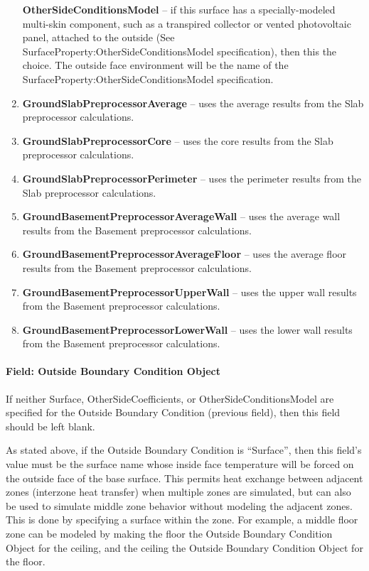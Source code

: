 \begin{enumerate}
    \textbf{OtherSideConditionsModel} -- if this surface has a specially-modeled multi-skin component, such as a transpired collector or vented photovoltaic panel, attached to the outside (See SurfaceProperty:OtherSideConditionsModel specification), then this the choice. The outside face environment will be the name of the SurfaceProperty:OtherSideConditionsModel specification.
  \item
    \textbf{GroundSlabPreprocessorAverage} -- uses the average results from the Slab preprocessor calculations.
  \item
    \textbf{GroundSlabPreprocessorCore} -- uses the core results from the Slab preprocessor calculations.
  \item
    \textbf{GroundSlabPreprocessorPerimeter} -- uses the perimeter results from the Slab preprocessor calculations.
  \item
    \textbf{GroundBasementPreprocessorAverageWall} -- uses the average wall results from the Basement preprocessor calculations.
  \item
    \textbf{GroundBasementPreprocessorAverageFloor} -- uses the average floor results from the Basement preprocessor calculations.
  \item
    \textbf{GroundBasementPreprocessorUpperWall} -- uses the upper wall results from the Basement preprocessor calculations.
  \item
    \textbf{GroundBasementPreprocessorLowerWall} -- uses the lower wall results from the Basement preprocessor calculations.
\end{enumerate}

\paragraph{Field: Outside Boundary Condition Object}\label{field-outside-boundary-condition-object-7}

If neither Surface, OtherSideCoefficients, or OtherSideConditionsModel are specified for the Outside Boundary Condition (previous field), then this field should be left blank.

As stated above, if the Outside Boundary Condition is ``Surface'', then this field's value must be the surface name whose inside face temperature will be forced on the outside face of the base surface. This permits heat exchange between adjacent zones (interzone heat transfer) when multiple zones are simulated, but can also be used to simulate middle zone behavior without modeling the adjacent zones. This is done by specifying a surface within the zone. For example, a middle floor zone can be modeled by making the floor the Outside Boundary Condition Object for the ceiling, and the ceiling the Outside Boundary Condition Object for the floor.


